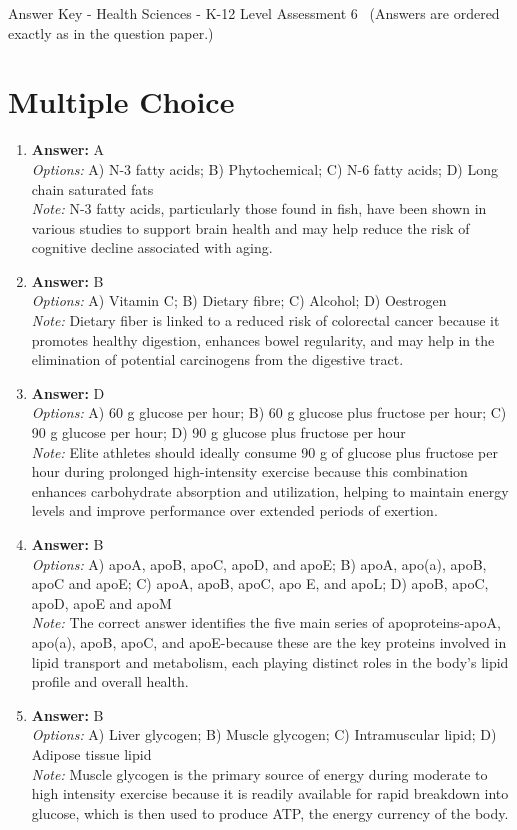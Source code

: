 \documentclass[12pt]{article}
\begin{document}
\begin{center}
Answer Key - Health Sciences - K-12 Level Assessment 6 \
\small (Answers are ordered exactly as in the question paper.)
\end{center}

\section*{Multiple Choice}
\begin{enumerate}[label=\arabic*.]
\item \textbf{Answer:} A
\\ \textit{Options:} A) N-3 fatty acids; B) Phytochemical; C) N-6 fatty acids; D) Long chain saturated fats
\\ \textit{Note:} N-3 fatty acids, particularly those found in fish, have been shown in various studies to support brain health and may help reduce the risk of cognitive decline associated with aging.
\item \textbf{Answer:} B
\\ \textit{Options:} A) Vitamin C; B) Dietary fibre; C) Alcohol; D) Oestrogen
\\ \textit{Note:} Dietary fiber is linked to a reduced risk of colorectal cancer because it promotes healthy digestion, enhances bowel regularity, and may help in the elimination of potential carcinogens from the digestive tract.
\item \textbf{Answer:} D
\\ \textit{Options:} A) 60 g glucose per hour; B) 60 g glucose plus fructose per hour; C) 90 g glucose per hour; D) 90 g glucose plus fructose per hour
\\ \textit{Note:} Elite athletes should ideally consume 90 g of glucose plus fructose per hour during prolonged high-intensity exercise because this combination enhances carbohydrate absorption and utilization, helping to maintain energy levels and improve performance over extended periods of exertion.
\item \textbf{Answer:} B
\\ \textit{Options:} A) apoA, apoB, apoC, apoD, and apoE; B) apoA, apo(a), apoB, apoC and apoE; C) apoA, apoB, apoC, apo E, and apoL; D) apoB, apoC, apoD, apoE and apoM
\\ \textit{Note:} The correct answer identifies the five main series of apoproteins-apoA, apo(a), apoB, apoC, and apoE-because these are the key proteins involved in lipid transport and metabolism, each playing distinct roles in the body's lipid profile and overall health.
\item \textbf{Answer:} B
\\ \textit{Options:} A) Liver glycogen; B) Muscle glycogen; C) Intramuscular lipid; D) Adipose tissue lipid
\\ \textit{Note:} Muscle glycogen is the primary source of energy during moderate to high intensity exercise because it is readily available for rapid breakdown into glucose, which is then used to produce ATP, the energy currency of the body.
\end{enumerate}
\end{document}
